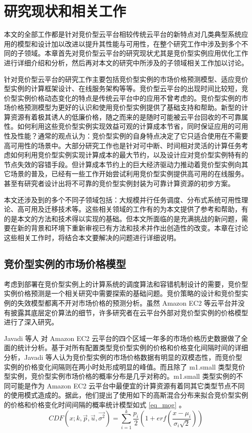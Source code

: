 \chapter{研究现状和相关工作}
\label{cha:background}

本文的全部工作都是针对竞价型云平台相较传统云平台的新特点对几类典型系统应用的模型和设计加以改进以提升其性能与可用性，在整个研究工作中涉及到多个不同的子领域。本章首先对竞价型云平台的研究现状尤其是竞价型实例应用优化工作进行详细介绍和分析，然后再对本文的研究中所涉及的子领域相关工作加以讨论。

针对竞价型云平台的研究工作主要包括竞价型实例的市场价格预测模型、适应竞价型实例的计算框架设计、在线服务架构等等。竞价型云平台的出现时间比较短，竞价型实例价格动态变化的特点是传统云平台中的应用不曾考虑的。竞价型实例的市场价格预测模型为更好的认识和使用竞价型实例提供了基础支持和帮助。新型的计算资源有着极其诱人的低廉价格，随之而来的是随时可能被云平台回收的不可靠属性。如何利用这些竞价型实例实现效益可观的计算成本节省，同时保证应用的可用性及性能？通常的观点认为：竞价型实例的自身特点决定了它只适合使用在不需要高可用性的场景中。大部分研究工作也是针对可中断、时间相对灵活的计算任务考虑如何利用竞价型实例实现计算成本的最大节约，以及设计应对竞价型实例特有的节点失效的容错手段。但计算成本节约上的巨大经济驱动力推动着竞价型实例向其它场景的普及，已经有一些工作开始尝试利用竞价型实例提供高可用的在线服务。甚至有研究者设计出将不可靠的竞价型实例封装为可靠计算资源的初步方案。

本文还涉及到的多个不同子领域包括：大规模并行任务调度、分布式系统可用性理论、高可用及迁移技术等。这些相关领域的工作有的为本文提供了参考和帮助，有的是本文的方法和技术得以实现的基础。但本文所面临的是充满挑战的新问题，需要在新的背景和环境下重新审视已有方法和技术并作出创造性的改变。本章在讨论这些相关工作时，将结合本文要解决的问题进行详细说明。

\section{竞价型实例的市场价格模型}
考虑到部署在竞价型实例上的计算系统的调度算法和容错机制设计的需要，竞价型实例价格预测是一个相关研究中需要探索的基础问题。竞价策略的设计和竞价型实例的失效模型都离不开对市场价格的预测分析。虽然 Amazon EC2 等云平台并没有披露其底层定价算法的细节，许多研究者在云平台外部对竞价型实例的价格模型进行了深入研究。

Javadi 等人 \cite{Javadi:2011:SMS:2120969.2121740} 对 Amazon EC2 云平台的四个区域一年多的市场价格历史数据做了全面的统计分析。基于对所有配置类型竞价型实例的价格和价格变化间隔时间的详细分析，Javadi 等人认为竞价型实例的市场价格数据有明显的双模态性，而竞价型实例的价格变化间隔则在两小时处形成明显的峰值。而且除了 m1.small 类型竞价型实例，竞价型实例市场价格的概率分布是几乎对称的。m1.small 类型实例的不同可能是作为 Amazon EC2 云平台中最便宜的计算资源有着同其它类型节点不同的使用模式造成的。据此，他们提出了使用如下的高斯混合分布来拟合竞价型实例的价格和价格变化时间间隔的概率统计模型如式 \eqref{eq_mog} 。
\begin{equation}\label{eq_mog} 
CDF(x; k, \vec p, \vec u, \vec{\sigma^2}) = \sum_{i=1}^{k}{\frac{p_i}{2}(1+erf(\frac{x-\mu_i}{\sigma_i\sqrt{2}}))}
\end{equation}

